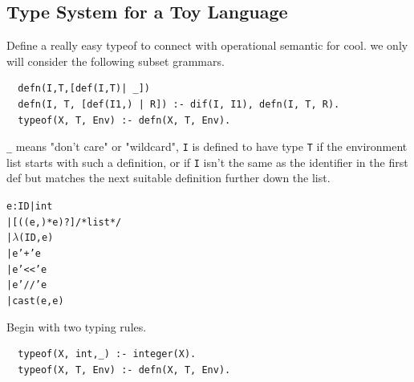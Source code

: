 \documentclass[a4paper]{exam}
\begin{document}
\subsection{Type System for a Toy Language}
Define \cite{cs164lec12} a really easy typeof to connect with operational semantic for cool. we only will consider the following subset grammars.
\begin{verbatim}
  defn(I,T,[def(I,T)| _])
  defn(I, T, [def(I1,) | R]) :- dif(I, I1), defn(I, T, R).
  typeof(X, T, Env) :- defn(X, T, Env).
  \end{verbatim}
\texttt{\_} means "don't care" or "wildcard", \texttt{I} is defined to have type \texttt{T} if the environment list starts with such a definition, or if \texttt{I} isn't the same as the identifier in the first def but matches the next suitable definition further down the list.
\begin{alltt}
  e : ID | int
  | [ ((e ,)* e)?  ] /* list */
  | \(\lambda\) ( ID , e )
  | e '+' e
  | e '<<' e
  | e '//' e
  | cast(e,e)
\end{alltt}

Begin with two typing rules.
\begin{verbatim}
  typeof(X, int,_) :- integer(X).
  typeof(X, T, Env) :- defn(X, T, Env).
\end{verbatim}
\end{document}
